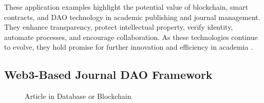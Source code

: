 \documentclass[lettersize,journal]{IEEEtran}
\begin{document}
These application examples highlight the potential value of blockchain, smart contracts, and DAO technology in academic publishing and journal management. They enhance transparency, protect intellectual property, verify identity, automate processes, and encourage collaboration. As these technologies continue to evolve, they hold promise for further innovation and efficiency in academia \cite{vacca2021systematic}.

\subsection{Web3-Based Journal DAO Framework}

\begin{figure}[!ht]
  \centering
  \hfil
  \caption{Article in Database or Blockchain}
  \label{fig:storage}
\end{figure}
\end{document}
